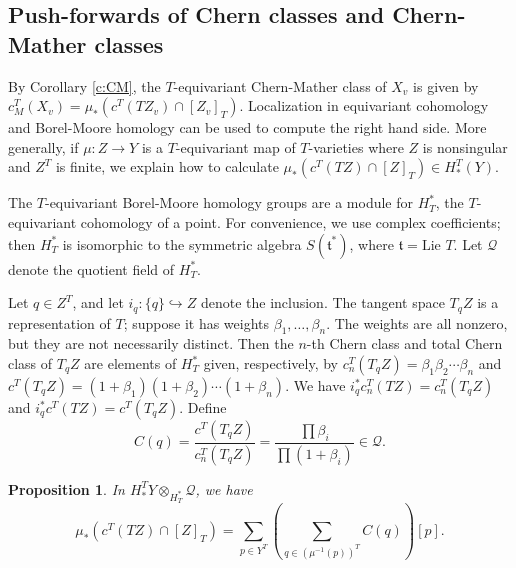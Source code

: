 \documentclass[11pt,letterpaper,reqno]{amsart}
\newcommand{\ft}{{\mathfrak t}}
\numberwithin{equation}{section}
\theoremstyle{plain}
\newtheorem{proposition}[theorem]{Proposition}
\theoremstyle{definition}
\theoremstyle{remark}
\newcommand{\cq}{\mathcal{Q}}
\newcommand{\gb}{\beta}
\begin{document}
\subsection{Push-forwards of Chern classes and Chern-Mather classes} \label{ss:Chern-Mather}
By Corollary \ref{c:CM}, the $T$-equivariant Chern-Mather class of $X_v$ is given by $c_M^T(X_v) = \mu_* (c^T (T Z_v) \cap [Z_v]_T)$.
Localization in equivariant cohomology and Borel-Moore homology can be used to compute the right hand side.
More generally, if $\mu: Z \to Y$ is a $T$-equivariant map of $T$-varieties where $Z$ is nonsingular and $Z^T$ is finite,
we explain how to calculate $\mu_*(c^T(TZ) \cap [Z]_T) \in H^T_*(Y)$.

The $T$-equivariant Borel-Moore homology groups are a module for $H^*_T$, the $T$-equivariant cohomology of a point.  For convenience,
we use complex coefficients; then $H^*_T$ is isomorphic to the symmetric algebra $S(\ft^*)$, where
$\ft = \mbox{Lie } T$.  Let $\cq$ denote the
quotient field of $H^*_T$.  

Let $q \in Z^T$, and let $i_q: \{q \} \hookrightarrow Z$ denote the inclusion.  The tangent space $T_q Z$ is a representation of
$T$; suppose it has weights $\gb_1, \ldots, \gb_n$.  The weights are all nonzero, but they are not necessarily distinct.
Then the $n$-th Chern class and total Chern class of $T_q Z$ are elements of $H^*_T$ given, respectively, by
$c_n^T(T_q Z) = \gb_1 \gb_2 \cdots \gb_n$ and $c^T(T_q Z) = (1 + \gb_1) (1 + \gb_2) \cdots (1 + \gb_n)$.
We have $i_q^* c^T_n(TZ) = c_n^T(T_q Z)$ and $i_q^* c^T(TZ) = c^T(T_q Z)$.  Define
\begin{equation} \label{e:cq}
C(q) = \frac{c^T(T_q Z)}{c^T_n(T_q Z)} = \frac{\prod \gb_i}{\prod(1 + \gb_i) } \in \cq.
\end{equation}

\begin{proposition} \label{p:pushforward}
In $H^T_*Y \otimes_{H^*_T} \cq$, we have
\begin{equation} \label{e:pushforward}
\mu_* (c^T(TZ) \cap [Z]_T) = \sum_{p \in Y^T} ( \sum_{q \in (\mu^{-1}(p))^T} C(q) ) [p].
\end{equation}
\end{proposition}
\end{document}
